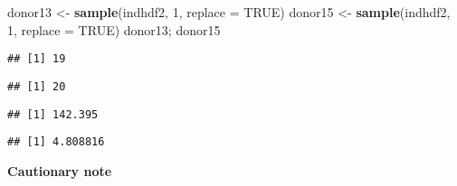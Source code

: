 \documentclass[
]{article}
\newenvironment{Shaded}{\begin{snugshade}}{\end{snugshade}}
\newcommand{\CommentTok}[1]{\textcolor[rgb]{0.56,0.35,0.01}{\textit{#1}}}
\newcommand{\DataTypeTok}[1]{\textcolor[rgb]{0.13,0.29,0.53}{#1}}
\newcommand{\DecValTok}[1]{\textcolor[rgb]{0.00,0.00,0.81}{#1}}
\newcommand{\KeywordTok}[1]{\textcolor[rgb]{0.13,0.29,0.53}{\textbf{#1}}}
\newcommand{\NormalTok}[1]{#1}
\newcommand{\OperatorTok}[1]{\textcolor[rgb]{0.81,0.36,0.00}{\textbf{#1}}}
\newcommand{\OtherTok}[1]{\textcolor[rgb]{0.56,0.35,0.01}{#1}}
\newcommand{\StringTok}[1]{\textcolor[rgb]{0.31,0.60,0.02}{#1}}
\begin{document}
\begin{Shaded}
\begin{Highlighting}[]
\NormalTok{donor13 \textless{}{-}}\StringTok{ }\KeywordTok{sample}\NormalTok{(indhdf2, }\DecValTok{1}\NormalTok{, }\DataTypeTok{replace =} \OtherTok{TRUE}\NormalTok{)}
\NormalTok{donor15 \textless{}{-}}\StringTok{ }\KeywordTok{sample}\NormalTok{(indhdf2, }\DecValTok{1}\NormalTok{, }\DataTypeTok{replace =} \OtherTok{TRUE}\NormalTok{)}
\NormalTok{donor13; donor15}
\end{Highlighting}
\end{Shaded}

\begin{verbatim}
## [1] 19
\end{verbatim}

\begin{verbatim}
## [1] 20
\end{verbatim}

\begin{Shaded}
\end{Shaded}

\begin{verbatim}
## [1] 142.395
\end{verbatim}

\begin{verbatim}
## [1] 4.808816
\end{verbatim}

\begin{Large}\begin{center}\textbf{Cautionary note}\end{center}\end{Large}
\end{document}
